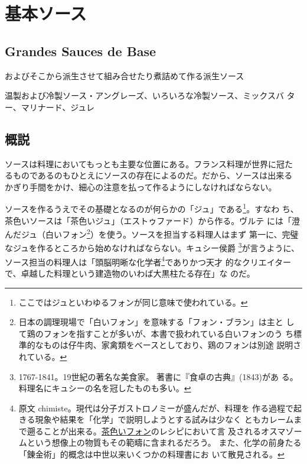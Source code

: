 \newpage

\hypertarget{ux57faux672cux30bdux30fcux30b9}{%
\section{基本ソース}\label{ux57faux672cux30bdux30fcux30b9}}

\hypertarget{grandes-sauces-de-base}{%
\subsection{Grandes Sauces de Base}\label{grandes-sauces-de-base}}


およびそこから派生させて組み合せたり煮詰めて作る派生ソース

温製および冷製ソース・アングレーズ、いろいろな冷製ソース、ミックスバ
ター、マリナード、ジュレ

\hypertarget{ux6982ux8aac}{%
\subsection{概説}\label{ux6982ux8aac}}

ソースは料理においてもっとも主要な位置にある。フランス料理が世界に冠た
るものであるのもひとえにソースの存在によるのだ。だから、ソースは出来る
かぎり手間をかけ、細心の注意を払って作るようにしなければならない。

ソースを作るうえでその基礎となるのが何らかの「ジュ」である\footnote{ここではジュといわゆるフォンが同じ意味で使われている。}。すなわ
ち、茶色いソースは「茶色いジュ」（エストゥファード）から作る。ヴルテ
には「澄んだジュ（白いフォン\footnote{日本の調理現場で「白いフォン」を意味する「フォン・ブラン」は主と
  して鶏のフォンを指すことが多いが、本書で扱われている白いフォンのう
  ち標準的なものは仔牛肉、家禽類をベースとしており、鶏のフォンは別途
  説明されている。}）を使う。ソースを担当する料理人はまず
第一に、完璧なジュを作るところから始めなければならない。キュシー侯爵
\footnote{1767-1841。19世紀の著名な美食家。
  著書に『食卓の古典』(1843)があ
  る。料理名にキュシーの名を冠したものも多い。}が言うように、ソース担当の料理人は「頭脳明晰な化学者\footnote{原文
  chimiste。現代は分子ガストロノミーが盛んだが、料理を
  作る過程で起きる現象や結果を「化学」で説明しようとする試みは少なく
  ともカレームまで遡ることが出来る。\protect\hyperlink{fonds-brun}{茶色いフォン}のレシピにおいて言
  及されるオスマゾームという想像上の物質もその範疇に含まれるだろう。
  また、化学の前身たる「錬金術」的概念は中世以来いくつかの料理書にお
  いて散見される。}でありかつ天才
的なクリエイターで、卓越した料理という建造物のいわば大黒柱たる存在」な
のだ。


